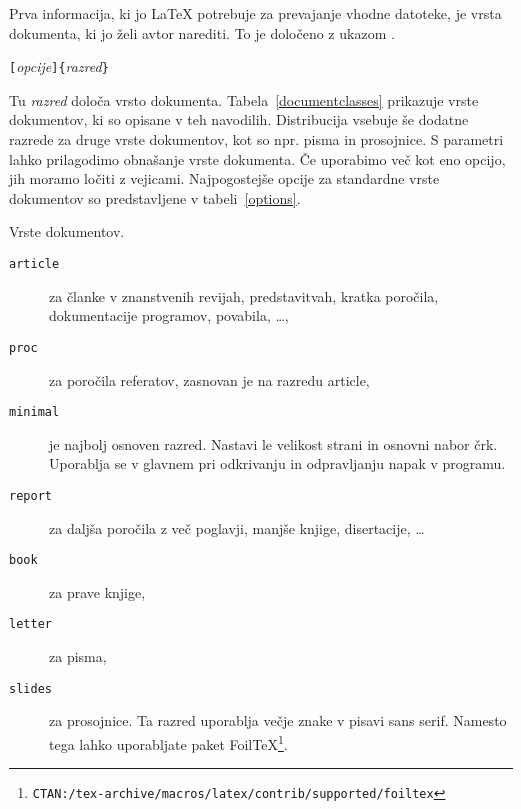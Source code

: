 Prva informacija, ki jo \LaTeX{} potrebuje za prevajanje vhodne datoteke, 
je vrsta dokumenta, ki jo želi avtor narediti. To je določeno
z ukazom .
\begin{lscommand}
\verb|[|\emph{opcije}\verb|]{|\emph{razred}\verb|}|
\end{lscommand}
\noindent Tu \emph{razred} določa vrsto dokumenta.
Tabela~\ref{documentclasses} prikazuje vrste dokumentov, ki so opisane v teh navodilih. 
Distribucija \LaTeXe{} vsebuje še dodatne razrede za druge vrste dokumentov, kot so
npr. pisma in prosojnice. S parametri 
\emph{} lahko prilagodimo obnašanje vrste dokumenta. Če uporabimo več kot eno
opcijo, jih moramo ločiti z vejicami. Najpogostejše opcije za standardne vrste dokumentov so 
predstavljene v tabeli~\ref{options}.

\begin{table}[!bp]
\caption{Vrste dokumentov.} \label{documentclasses}
\begin{lined}{12cm}
\begin{description}
 
\item [\normalfont\texttt{article}] za članke v znanstvenih revijah, predstavitvah, 
  kratka poročila, dokumentacije programov, povabila, \ldots,
\item [\normalfont\texttt{proc}] za poročila referatov, zasnovan je na razredu article,
\item [\normalfont\texttt{minimal}] je najbolj osnoven razred. Nastavi le
velikost strani in osnovni nabor črk. Uporablja se v glavnem pri odkrivanju
in odpravljanju napak v programu.
\item [\normalfont\texttt{report}] za daljša poročila z več poglavji, manjše knjige, disertacije, \ldots 
\item [\normalfont\texttt{book}] za prave knjige, 
\item [\normalfont\texttt{letter}] za pisma, 
\item [\normalfont\texttt{slides}] za prosojnice. Ta razred uporablja večje znake v pisavi sans serif. 
    Namesto tega lahko uporabljate paket Foil\TeX{}\footnote{%
        \texttt{CTAN:/tex-archive/macros/latex/contrib/supported/foiltex}}.
\end{description}
\end{lined}
\end{table}

